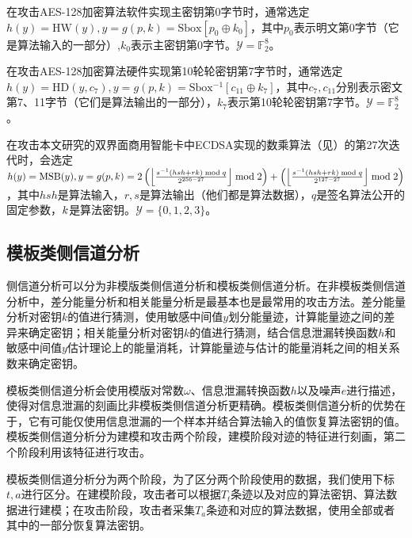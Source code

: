 {	\begin{example}\label{ex:aessw}
		在攻击AES-128加密算法软件实现主密钥第0字节时，通常选定$h(y)=\mathrm{HW}(y), y=g(p,k)=\mathrm{Sbox}[p_0\oplus k_0]$，其中$p_0$表示明文第0字节（它是算法输入的一部分）,$k_0$表示主密钥第0字节。$\mathcal Y=\mathbb F_2^8$。
	\end{example}

	\begin{example}
		在攻击AES-128加密算法硬件实现第10轮轮密钥第7字节时，通常选定$h(y)=\mathrm{HD}(y,c_7), y=g(p,k)=\mathrm{Sbox^{-1}}[c_{11}\oplus k_{7}]$，其中$c_7,c_{11}$分别表示密文第7、11字节（它们是算法输出的一部分），$k_7$表示第10轮轮密钥第7字节。$\mathcal Y=\mathbb F_2^8$。
	\end{example}

	\begin{example}\label{ex:ecdsa}
		在攻击本文研究的双界面商用智能卡中ECDSA实现的数乘算法（见）的第27次迭代时，会选定$h(y)=\mathrm{MSB}(y), y=g(p,k)=2\left( \left\lfloor \frac{s^{-1}(hsh+rk)\bmod q}{2^{256-27}}\right\rfloor \bmod 2\right)+\left( \left\lfloor \frac{s^{-1}(hsh+rk)\bmod q}{2^{127-27}}\right\rfloor\bmod 2\right) $，其中$hsh$是算法输入，$r,s$是算法输出（他们都是算法数据），$q$是签名算法公开的固定参数，$k$是算法密钥。$\mathcal Y=\{0,1,2,3\}$。
	\end{example}
	\subsection{模板类侧信道分析}
	
	侧信道分析可以分为非模版类侧信道分析和模板类侧信道分析。在非模板类侧信道分析中，差分能量分析\citep{KocherJJ99, Messerges00, BevanK02}和相关能量分析\citep{Brier04}是最基本也是最常用的攻击方法。差分能量分析对密钥$k$的值进行猜测，使用敏感中间值$y$划分能量迹，计算能量迹之间的差异来确定密钥；相关能量分析对密钥$k$的值进行猜测，结合信息泄漏转换函数$h$和敏感中间值$y$估计理论上的能量消耗，计算能量迹与估计的能量消耗之间的相关系数来确定密钥。
	
	模板类侧信道分析会使用模版对常数$\omega$、信息泄漏转换函数$h$以及噪声$e$进行描述，使得对信息泄漏的刻画比非模板类侧信道分析更精确。模板类侧信道分析的优势在于，它有可能仅使用信息泄漏的一个样本并结合算法输入的值恢复算法密钥的值。模板类侧信道分析分为建模和攻击两个阶段，建模阶段对迹的特征进行刻画，第二个阶段利用该特征进行攻击\citep{Mangard07}。
	
	模板类侧信道分析分为两个阶段，为了区分两个阶段使用的数据，我们使用下标$t,a$进行区分。在建模阶段，攻击者可以根据$T_t$条迹以及对应的算法密钥、算法数据进行建模；在攻击阶段，攻击者采集$T_a$条迹和对应的算法数据，使用全部或者其中的一部分恢复算法密钥。
	
}
